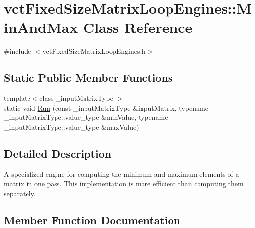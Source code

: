 \hypertarget{classvct_fixed_size_matrix_loop_engines_1_1_min_and_max}{}\section{vct\+Fixed\+Size\+Matrix\+Loop\+Engines\+:\+:Min\+And\+Max Class Reference}
\label{classvct_fixed_size_matrix_loop_engines_1_1_min_and_max}


{\ttfamily \#include $<$vct\+Fixed\+Size\+Matrix\+Loop\+Engines.\+h$>$}

\subsection*{Static Public Member Functions}
\begin{DoxyCompactItemize}
\item 
{\footnotesize template$<$class \+\_\+input\+Matrix\+Type $>$ }\\static void \hyperlink{classvct_fixed_size_matrix_loop_engines_1_1_min_and_max_ac741cdb4fecf6e19498d59b7d9ee6354}{Run} (const \+\_\+input\+Matrix\+Type \&input\+Matrix, typename \+\_\+input\+Matrix\+Type\+::value\+\_\+type \&min\+Value, typename \+\_\+input\+Matrix\+Type\+::value\+\_\+type \&max\+Value)
\end{DoxyCompactItemize}


\subsection{Detailed Description}
A specialized engine for computing the minimum and maximum elements of a matrix in one pass. This implementation is more efficient than computing them separately. 

\subsection{Member Function Documentation}
\hypertarget{classvct_fixed_size_matrix_loop_engines_1_1_min_and_max_ac741cdb4fecf6e19498d59b7d9ee6354}{}
